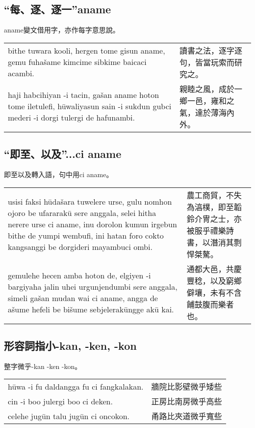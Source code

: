 \documentclass{article}
\begin{document}
\subsection{“每、逐、逐一”aname}
\noindent aname變文借用字，亦作每字意思說。
\begin{center}
    \begin{tabularx}{\textwidth}{XX}
        bithe tuwara kooli, hergen tome gisun aname, gemu fuha\v{s}ame kimcime sibkime baicaci acambi. & 讀書之法，逐字逐句，皆當玩索而研究之。\\
        haji habcihiyan -i tacin, ga\v{s}an aname hoton tome iletulefi, h\={u}waliyasun sain -i sukdun gubci mederi -i dorgi tulergi de hafunambi. & 親睦之風，成於一鄉一邑，雍和之氣，達於薄海內外。
    \end{tabularx}
\end{center}

\subsection{“即至、以及”...ci aname}
\noindent 即至以及轉入語，句中用ci aname。
\begin{center}
    \begin{tabularx}{\textwidth}{XX}
        usisi faksi h\={u}da\v{s}ara tuwelere urse, gulu nomhon ojoro be ufararak\={u} sere anggala, selei hitha nerere urse ci aname, inu dorolon kumun irgebun bithe de yumpi wembufi, ini hatan foro cokto kangsanggi be dorgideri mayambuci ombi. & 農工商貿，不失為湻樸，即至韜鈴介冑之士，亦被服乎禮樂詩書，以潛消其剽悍桀驁。\\
        gemulehe hecen amba hoton de, elgiyen -i bargiyaha jalin uhei urgunjendumbi sere anggala, simeli ga\v{s}an mudan wai ci aname, angga de a\v{s}ume hefeli be bi\v{s}ume sebjelerak\={u}ngge ak\={u} kai. & 通都大邑，共慶豐稔，以及窮鄉僻壤，未有不含餔鼓腹而樂者也。
    \end{tabularx}
\end{center}

\subsection{形容詞指小-kan, -ken, -kon}
\noindent 整字微乎-kan -ken -kon。
\begin{center}
    \begin{tabularx}{\textwidth}{XX}
        h\={u}wa -i fu daldangga fu ci fangkalakan. & 牆院比影壁微乎矮些\\
        cin -i boo julergi boo ci deken. & 正房比南房微乎高些\\
        celehe jug\={u}n talu jug\={u}n ci oncokon. & 甬路比夾道微乎寬些
    \end{tabularx}
\end{center}
\end{document}
